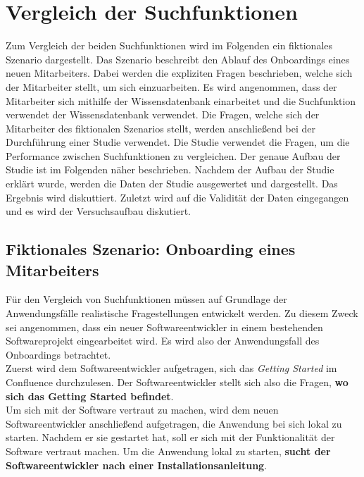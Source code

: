 \chapter{Vergleich der Suchfunktionen}
\label{chap:vergleich-der-suchfunktionen}

Zum Vergleich der beiden Suchfunktionen wird im Folgenden ein fiktionales Szenario dargestellt.
Das Szenario beschreibt den Ablauf des Onboardings eines neuen Mitarbeiters.
Dabei werden die expliziten Fragen beschrieben, welche sich der Mitarbeiter stellt, um sich einzuarbeiten.
Es wird angenommen, dass der Mitarbeiter sich mithilfe der Wissensdatenbank einarbeitet und die Suchfunktion verwendet der Wissensdatenbank verwendet.
Die Fragen, welche sich der Mitarbeiter des fiktionalen Szenarios stellt, werden anschließend bei der Durchführung einer Studie verwendet.
Die Studie verwendet die Fragen, um die Performance zwischen Suchfunktionen zu vergleichen.
Der genaue Aufbau der Studie ist im Folgenden näher beschrieben.
Nachdem der Aufbau der Studie erklärt wurde, werden die Daten der Studie ausgewertet und dargestellt.
Das Ergebnis wird diskuttiert.
Zuletzt wird auf die Validität der Daten eingegangen und es wird der Versuchsaufbau diskutiert.

\section{Fiktionales Szenario: Onboarding eines Mitarbeiters}

Für den Vergleich von Suchfunktionen müssen auf Grundlage der Anwendungsfälle realistische Fragestellungen entwickelt werden.
Zu diesem Zweck sei angenommen, dass ein neuer Softwareentwickler in einem bestehenden Softwareprojekt eingearbeitet wird.
Es wird also der Anwendungsfall des Onboardings betrachtet.\\

Zuerst wird dem Softwareentwickler aufgetragen, sich das \textit{Getting Started} im Confluence durchzulesen.
Der Softwareentwickler stellt sich also die Fragen, \textbf{wo sich das Getting Started befindet}.\\

Um sich mit der Software vertraut zu machen, wird dem neuen Softwareentwickler anschließend aufgetragen, die Anwendung bei sich lokal zu starten.
Nachdem er sie gestartet hat, soll er sich mit der Funktionalität der Software vertraut machen.
Um die Anwendung lokal zu starten, \textbf{sucht der Softwareentwickler nach einer Installationsanleitung}.\\

